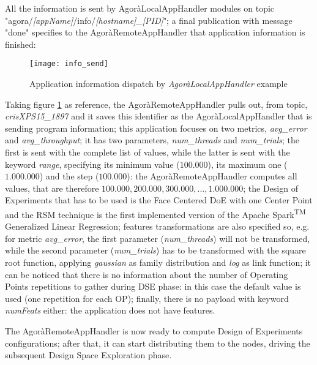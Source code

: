 All the information is sent by AgoràLocalAppHandler modules on topic "agora\slash{}\textit{[appName]}\slash{}info\slash{}\textit{[hostname]\_[PID]}"; a final publication with message "done" specifies to the AgoràRemoteAppHandler that application information is finished:

\begin{figure}[H]

    \centering
    \texttt{[image: info\_send]}
    \caption{Application information dispatch by \textit{AgoràLocalAppHandler} example}
    \label{fig:info_send}
    
\end{figure}

Taking figure \ref{fig:info_send} as reference, the AgoràRemoteAppHandler pulls out, from topic, \textit{crisXPS15\_1897} and it saves this identifier as the AgoràLocalAppHandler that is sending program information; this application focuses on two metrics, \textit{avg\_error} and \textit{avg\_throughput}; it has two parameters, \textit{num\_threads} and \textit{num\_trials}; the first is sent with the complete list of values, while the latter is sent with the keyword \textit{range}, specifying its minimum value ($100.000$), its maximum one ($1.000.000$) and the step ($100.000$): the AgoràRemoteAppHandler computes all values, that are therefore $100.000, 200.000, 300.000, ..., 1.000.000$; the Design of Experiments that has to be used is the Face Centered DoE with one Center Point and the RSM technique is the first implemented version of the Apache Spark\textsuperscript{TM} Generalized Linear Regression; features transformations are also specified so, e.g. for metric \textit{avg\_error}, the first parameter (\textit{num\_threads}) will not be transformed, while the second parameter (\textit{num\_trials}) has to be transformed with the square root function, applying \textit{gaussian} as family distribution and \textit{log} as link function; it can be noticed that there is no information about the number of Operating Points repetitions to gather during DSE phase: in this case the default value is used (one repetition for each OP); finally, there is no payload with keyword \textit{numFeats} either: the application does not have features.

The AgoràRemoteAppHandler is now ready to compute Design of Experiments configurations; after that, it can start distributing them to the nodes, driving the subsequent Design Space Exploration phase.





